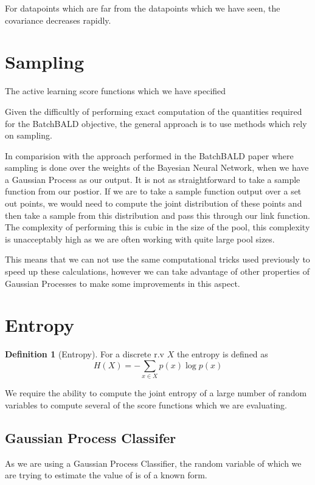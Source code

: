 \documentclass[12pt, a4paper]{report}
\theoremstyle{definition}
\newtheorem{definition}{Definition}[section]
\begin{document}
For datapoints which are far from the datapoints which we have seen, the covariance decreases rapidly. 




\section{Sampling}

The active learning score functions which we have specified

Given the difficultly of performing exact computation of the quantities required for the BatchBALD objective, the general approach is to use methods which rely on sampling.

In comparision with the approach performed in the BatchBALD paper where sampling is done over the weights of the Bayesian Neural Network, when we have a Gaussian Process as our output. It is not as straightforward to take a sample function from our postior. If we are to take a sample function output over a set out points, we would need to compute the joint distribution of these points and then take a sample from this distribution and pass this through our link function.
The complexity of performing this is cubic in the size of the pool, this complexity is unacceptably high as we are often working with quite large pool sizes.

This means that we can not use the same computational tricks used previously to speed up these calculations, however we can take advantage of other properties of Gaussian Processes to make some improvements in this aspect.


\section{Entropy}
\label{sec:Entropy}

\begin{definition}[Entropy]
    For a discrete r.v $X$ the entropy is defined as $$H(X) = - \sum_{x \in X} p(x) \log p(x) $$
\end{definition}


We require the ability to compute the joint entropy of a large number of random variables to compute several of the score functions which we are evaluating.

\subsection{Gaussian Process Classifer}
As we are using a Gaussian Process Classifier, the random variable of which we are trying to estimate the value of is of a known form.
\end{document}

